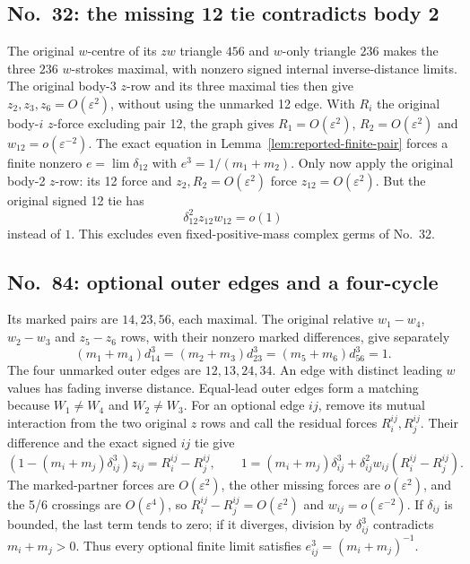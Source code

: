 \documentclass[11pt]{amsart}
\theoremstyle{remark}
\begin{document}
\subsection{No.~32: the missing 12 tie contradicts body 2}\label{sec:no32-tie}
The original $w$-centre of its $zw$ triangle $456$ and $w$-only triangle $236$ makes the three $236$ $w$-strokes maximal, with nonzero signed internal inverse-distance limits. The original body-3 $z$-row and its three maximal ties then give $z_2,z_3,z_6=O(\varepsilon^2)$, without using the unmarked 12 edge. With $R_i$ the original body-$i$ $z$-force excluding pair 12, the graph gives $R_1=O(\varepsilon^2)$, $R_2=O(\varepsilon^2)$ and $w_{12}=o(\varepsilon^{-2})$. The exact equation in Lemma~\ref{lem:reported-finite-pair} forces a finite nonzero $e=\lim\delta_{12}$ with $e^3=1/(m_1+m_2)$. Only now apply the original body-2 $z$-row: its 12 force and $z_2,R_2=O(\varepsilon^2)$ force $z_{12}=O(\varepsilon^2)$. But the original signed 12 tie has
\[
\delta_{12}^2z_{12}w_{12}=o(1)
\]
instead of $1$. This excludes even fixed-positive-mass complex germs of No.~32.

\subsection{No.~84: optional outer edges and a four-cycle}\label{sec:no84-cycle}
Its marked pairs are $14,23,56$, each maximal. The original relative $w_1-w_4$, $w_2-w_3$ and $z_5-z_6$ rows, with their nonzero marked differences, give separately
\[
(m_1+m_4)d_{14}^3=(m_2+m_3)d_{23}^3=(m_5+m_6)d_{56}^3=1.
\]
The four unmarked outer edges are $12,13,24,34$. An edge with distinct leading $w$ values has fading inverse distance. Equal-lead outer edges form a matching because $W_1\ne W_4$ and $W_2\ne W_3$. For an optional edge $ij$, remove its mutual interaction from the two original $z$ rows and call the residual forces $R_i^{ij},R_j^{ij}$. Their difference and the exact signed $ij$ tie give
\[
(1-(m_i+m_j)\delta_{ij}^3)z_{ij}=R_i^{ij}-R_j^{ij},\qquad
1=(m_i+m_j)\delta_{ij}^3+\delta_{ij}^2w_{ij}(R_i^{ij}-R_j^{ij}).
\]
The marked-partner forces are $O(\varepsilon^2)$, the other missing forces are $o(\varepsilon^2)$, and the 5/6 crossings are $O(\varepsilon^4)$, so $R_i^{ij}-R_j^{ij}=O(\varepsilon^2)$ and $w_{ij}=o(\varepsilon^{-2})$. If $\delta_{ij}$ is bounded, the last term tends to zero; if it diverges, division by $\delta_{ij}^3$ contradicts $m_i+m_j>0$. Thus every optional finite limit satisfies $e_{ij}^3=(m_i+m_j)^{-1}$.
\end{document}
